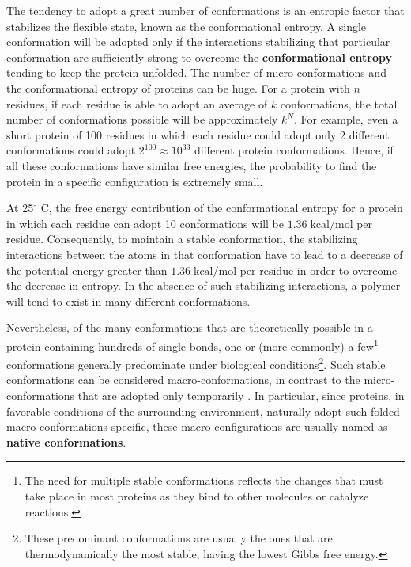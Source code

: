 
The tendency to adopt a great number of conformations is an entropic factor that stabilizes the flexible state, known as the conformational entropy.
A single conformation will be adopted only if the interactions stabilizing that particular conformation are sufficiently strong to overcome the \textbf{conformational entropy} tending to keep the protein unfolded. The number of micro-conformations and the conformational entropy of proteins can be huge. For a protein with $n$ residues, if each residue is able to adopt an average of $k$ conformations, the total number of conformations possible will be approximately $k^N$. For example, even a short protein of 100 residues in which each residue could adopt only 2 different conformations could adopt $2^{100} \approx 10^{33}$ different protein conformations. Hence, if all these conformations have similar free energies, the probability to find the protein in a specific configuration is extremely small. 

At 25$^\circ$ C, the free energy contribution of the conformational entropy for a protein in which each residue can adopt 10 conformations will be $1.36 \;\text{kcal}/\text{mol}$ per residue. Consequently, to maintain a stable conformation, the stabilizing interactions between the atoms in that conformation have to lead to a decrease of the potential energy greater than $1.36 \;\text{kcal}/\text{mol}$ per residue in order to overcome the decrease in entropy. In the absence of such stabilizing interactions, a polymer will tend to exist in many different conformations. 

Nevertheless, of the many conformations that are theoretically possible in a protein containing hundreds of single bonds, one or (more commonly) a few\footnote{The need for multiple stable conformations reflects the changes that must take place in most proteins as they bind to other molecules or catalyze reactions.} conformations generally predominate under biological conditions\footnote{These predominant conformations are usually the ones that are thermodynamically the most stable, having the lowest Gibbs free energy.}. Such stable conformations can be considered macro-conformations, in contrast to the micro-conformations that are adopted only temporarily
\cite{creighton2010biophysical}.
In particular, since proteins, in favorable conditions of the surrounding environment, naturally adopt such folded macro-conformations specific, these macro-configurations are usually named as \textbf{native conformations}. %

